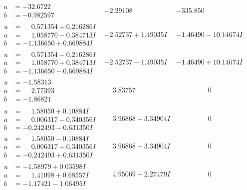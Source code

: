 \documentclass[1p]{elsarticle_modified}
\theoremstyle{definition}
\begin{document}
$$\begin{array}{c|c|c}
\begin{aligned}
a &= -32.6722\phantom{ +0.000000I} \\
b &= -0.982597\phantom{ +0.000000I}\end{aligned}
 & -2.29108\phantom{ +0.000000I} & -335.850\phantom{ +0.000000I} \\ \hline\begin{aligned}
u &= \phantom{-}0.571354 + 0.216286 I \\
a &= \phantom{-}1.058770 - 0.384713 I \\
b &= -1.136650 + 0.669884 I\end{aligned}
 & -2.52737 + 1.49035 I & -1.46490 - 10.14674 I \\ \hline\begin{aligned}
u &= \phantom{-}0.571354 - 0.216286 I \\
a &= \phantom{-}1.058770 + 0.384713 I \\
b &= -1.136650 - 0.669884 I\end{aligned}
 & -2.52737 - 1.49035 I & -1.46490 + 10.14674 I \\ \hline\begin{aligned}
u &= -1.58313\phantom{ +0.000000I} \\
a &= \phantom{-}2.77393\phantom{ +0.000000I} \\
b &= -1.86821\phantom{ +0.000000I}\end{aligned}
 & \phantom{-}3.83757\phantom{ +0.000000I} & \phantom{-0.000000 } 0 \\ \hline\begin{aligned}
u &= \phantom{-}1.58050 + 0.10884 I \\
a &= \phantom{-}0.006317 - 0.340356 I \\
b &= -0.242493 - 0.631350 I\end{aligned}
 & \phantom{-}3.96868 + 3.34904 I & \phantom{-0.000000 } 0 \\ \hline\begin{aligned}
u &= \phantom{-}1.58050 - 0.10884 I \\
a &= \phantom{-}0.006317 + 0.340356 I \\
b &= -0.242493 + 0.631350 I\end{aligned}
 & \phantom{-}3.96868 - 3.34904 I & \phantom{-0.000000 } 0 \\ \hline\begin{aligned}
u &= -1.58979 + 0.03598 I \\
a &= \phantom{-}1.41098 + 0.68557 I \\
b &= -1.17421 - 1.06495 I\end{aligned}
 & \phantom{-}4.95069 - 2.27479 I & \phantom{-0.000000 } 0 \\ \hline\begin{aligned}

\end{aligned}
\end{array}$$
\end{document}

